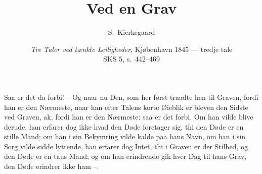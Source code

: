\documentclass[12pt,a4paper]{article}
\title{\textbf{Ved en Grav}}
\author{S.\ Kierkegaard}
\date{\emph{Tre Taler ved tænkte Leiligheder}, Kjøbenhavn 1845 --- tredje tale\\[2pt]
  {\small SKS 5, s.\ 442--469}}
\begin{document}
\maketitle
\thispagestyle{fancy}
\bigskip

\noindent Saa er det da forbi! – Og naar nu Den, som her først traadte hen til Graven, fordi han er den Nærmeste, naar han efter Talens korte Øieblik er bleven den Sidste ved Graven, ak, fordi han er den Nærmeste: saa er det forbi. Om han vilde blive derude, han erfarer dog ikke hvad den Døde foretager sig, thi den Døde er en stille Mand; om han i sin Bekymring vilde kalde paa hans Navn, om han i sin Sorg vilde sidde lyttende, han erfarer dog Intet, thi i Graven er der Stilhed, og den Døde er en taus Mand; og om han erindrende gik hver Dag til hans Grav, den Døde erindrer ikke ham –.
\end{document}
